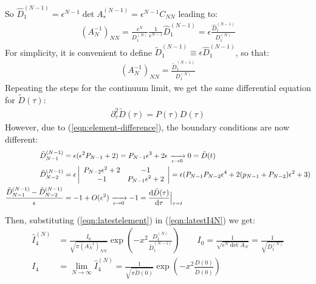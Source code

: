 \documentclass[../template.tex]{subfiles}
\begin{document}
So $\hat{D}_1^{(N-1)} = \epsilon^{N-1} \operatorname{det} A_*^{(N-1)} = \epsilon^{N-1} C_{NN}$ leading to:
\begin{align*}
    (A_N^{-1})_{NN} = \frac{\epsilon^N}{D_1^{(N)}} \frac{1}{\epsilon^{N-1}} \hat{D}_1^{(N-1)} = \epsilon \frac{\hat{D}_1^{(N-1)}}{D_1^{(N)}}   
\end{align*}
For simplicity, it is convenient to define $\tilde{D}_1^{(N-1)} \equiv \epsilon \hat{D}_1^{(N-1)}$, so that:
\begin{align}
    (A_N^{-1})_{NN} = \frac{\tilde{D}_1^{(N-1)}}{D_1^{(N)}} 
    \label{eqn:latestelement}
\end{align}
Repeating the steps for the continuum limit, we get the same differential equation for $\tilde{D}(\tau)$:
\begin{align*}
    \partial_\tau^2 \tilde{D}(\tau) = P(\tau) D(\tau)
\end{align*} 
However, due to (\ref{eqn:element-difference}), the boundary conditions are now different:
\begin{align*}
    \tilde{D}^{(N-1)}_{N-1} &= \epsilon(\epsilon^2 P_{N-1} + 2) = P_{N-1} \epsilon^3 + 2 \epsilon  \xrightarrow[\epsilon \to 0]{} 0 = \tilde{D}(t)\\
    \tilde{D}^{(N-1)}_{N-2} &= \epsilon \left|\begin{array}{cc}
    P_{N-2}\epsilon^2 + 2 & -1 \\ 
    -1 & P_{N-1}\epsilon^2 + 2
    \end{array}\right| = \epsilon(P_{N-1}P_{N-2} \epsilon^4 + 2(p_{N-1}+P_{N-2})\epsilon^2 + 3)\\
    \frac{\tilde{D}_{N-1}^{(N-1)}-\tilde{D}_{N-2}^{(N-1)}}{\epsilon} &= -1 + O(\epsilon^2)  \xrightarrow[\epsilon \to 0]{} -1 = \dv{\tilde{D}(\tau)}{\tau}\Big|_{\tau = t}
\end{align*}

Then, substituting (\ref{eqn:latestelement}) in (\ref{eqn:latestI4N}) we get:
\begin{align} \nonumber
    \hat{I}_4^{(N)} &= \frac{I_0}{\sqrt{\pi (A_N^{-1})_{NN}}} \exp\left(-x^2\frac{D_1^{(N)}}{\tilde{D}_1^{(N-1)}} \right) \qquad I_0 = \frac{1}{\sqrt{\epsilon^N \operatorname{det}A_N  }} = \frac{1}{\sqrt{ D_1^{(N)}}}\\
    I_4 &= \lim_{N \to\infty } \hat{I}_4^{(N)} = \frac{1}{\sqrt{\pi \tilde{D}(0)}} \exp\left(-x^2 \frac{D(0)}{\tilde{D}(0)} \right) 
    \label{eqn:hatI4}
\end{align}
\end{document}
